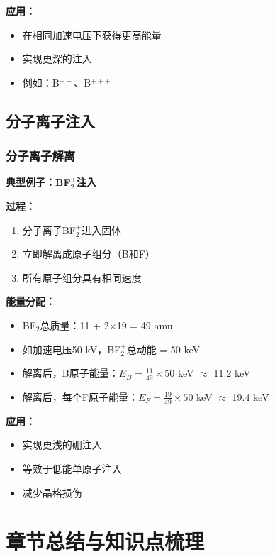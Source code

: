 \documentclass[UTF8,12pt,a4paper]{ctexart}
\begin{document}
\textbf{应用：}

\begin{itemize}
    \item 在相同加速电压下获得更高能量
    \item 实现更深的注入
    \item 例如：B$^{++}$、B$^{+++}$
\end{itemize}

\subsection{分子离子注入}

\subsubsection{分子离子解离}

\textbf{典型例子：BF$_2^+$注入}

\textbf{过程：}
\begin{enumerate}
    \item 分子离子BF$_2^+$进入固体
    \item 立即解离成原子组分（B和F）
    \item 所有原子组分具有相同速度
\end{enumerate}

\textbf{能量分配：}

\begin{itemize}
    \item BF$_2$总质量：11 + 2×19 = 49 amu
    \item 如加速电压50 kV，BF$_2^+$总动能 = 50 keV
    \item 解离后，B原子能量：$E_B = \frac{11}{49} \times 50$ keV $\approx$ 11.2 keV
    \item 解离后，每个F原子能量：$E_F = \frac{19}{49} \times 50$ keV $\approx$ 19.4 keV
\end{itemize}

\textbf{应用：}
\begin{itemize}
    \item 实现更浅的硼注入
    \item 等效于低能单原子注入
    \item 减少晶格损伤
\end{itemize}

\newpage

\section{章节总结与知识点梳理}
\end{document}
